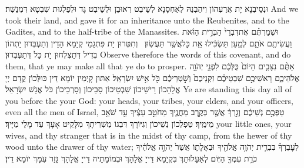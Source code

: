 {וּנְסֵיבְנָא יָת אֲרַעְהוֹן וִיהַבְנַהּ לְאַחְסָנָא לְשֵׁיבֶט רְאוּבֵן וּלְשֵׁיבֶט גָּד וּלְפַלְגוּת שִׁבְטָא דִּמְנַשֶּׁה׃}
{And we took their land, and gave it for an inheritance unto the Reubenites, and to the Gadites, and to the half-tribe of the Manassites.}{}
{וּשְׁמַרְתֶּ֗ם אֶת\maqqaf דִּבְרֵי֙ הַבְּרִ֣ית הַזֹּ֔את וַעֲשִׂיתֶ֖ם אֹתָ֑ם לְמַ֣עַן תַּשְׂכִּ֔ילוּ אֵ֖ת כׇּל\maqqaf אֲשֶׁ֥ר תַּעֲשֽׂוּן׃ \petucha }
{וְתִטְּרוּן יָת פִּתְגָמֵי קְיָמָא הָדֵין וְתַעְבְּדוּן יָתְהוֹן בְּדִיל דְּתַצְלְחוּן יָת כָּל דְּתַעְבְּדוּן׃}
{Observe therefore the words of this covenant, and do them, that ye may make all that ye do to prosper.}{}
\newseder
{}%
{אַתֶּ֨ם נִצָּבִ֤ים הַיּוֹם֙ כֻּלְּכֶ֔ם לִפְנֵ֖י יְהֹוָ֣ה אֱלֹהֵיכֶ֑ם רָאשֵׁיכֶ֣ם שִׁבְטֵיכֶ֗ם זִקְנֵיכֶם֙ וְשֹׁ֣טְרֵיכֶ֔ם כֹּ֖ל אִ֥ישׁ יִשְׂרָאֵֽל׃}
{אַתּוּן קָיְמִין יוֹמָא דֵין כּוּלְּכוֹן קֳדָם יְיָ אֱלָהָכוֹן רֵישֵׁיכוֹן שִׁבְטֵיכוֹן סָבֵיכוֹן וְסָרְכֵיכוֹן כֹּל אֱנָשׁ יִשְׂרָאֵל׃}
{Ye are standing this day all of you before the \lord\space your God: your heads, your tribes, your elders, and your officers, even all the men of Israel,}{}
{טַפְּכֶ֣ם נְשֵׁיכֶ֔ם וְגֵ֣רְךָ֔ אֲשֶׁ֖ר בְּקֶ֣רֶב מַחֲנֶ֑יךָ מֵחֹטֵ֣ב עֵצֶ֔יךָ עַ֖ד שֹׁאֵ֥ב מֵימֶֽיךָ׃}
{טַפְלְכוֹן נְשֵׁיכוֹן וְגִיּוֹרָךְ דִּבְגוֹ מַשְׁרִיתָךְ מִלָּקֵיט אָעָךְ עַד מָלֵי מַיָּיךְ׃}
{your little ones, your wives, and thy stranger that is in the midst of thy camp, from the hewer of thy wood unto the drawer of thy water;}{}
{לְעׇבְרְךָ֗ בִּבְרִ֛ית יְהֹוָ֥ה אֱלֹהֶ֖יךָ וּבְאָלָת֑וֹ אֲשֶׁר֙ יְהֹוָ֣ה אֱלֹהֶ֔יךָ כֹּרֵ֥ת עִמְּךָ֖ הַיּֽוֹם׃}
{לְאַעָלוּתָךְ בִּקְיָמָא דַּייָ אֱלָהָךְ וּבְמוֹמָתֵיהּ דַּייָ אֱלָהָךְ גָּזַר עִמָּךְ יוֹמָא דֵין׃}
